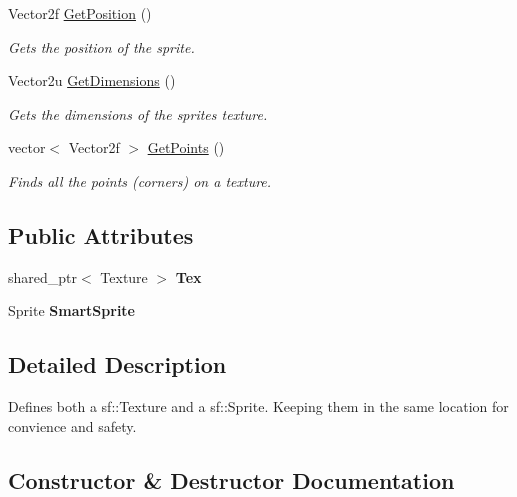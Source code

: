 \begin{DoxyCompactItemize}
Vector2f \hyperlink{struct_smart_texture_aec1d814d4f3dbbc6d5bf39e569b5fa30}{Get\+Position} ()
\begin{DoxyCompactList}\small\item\em Gets the position of the sprite. \end{DoxyCompactList}\item 
Vector2u \hyperlink{struct_smart_texture_a18d5089ac0e730deb87bda09377f5402}{Get\+Dimensions} ()
\begin{DoxyCompactList}\small\item\em Gets the dimensions of the sprites texture. \end{DoxyCompactList}\item 
vector$<$ Vector2f $>$ \hyperlink{struct_smart_texture_a38430739f5dce9ba11b9d91395ba4e30}{Get\+Points} ()
\begin{DoxyCompactList}\small\item\em Finds all the points (corners) on a texture. \end{DoxyCompactList}\end{DoxyCompactItemize}
\subsection*{Public Attributes}
\begin{DoxyCompactItemize}
\item 
\mbox{\label{struct_smart_texture_abd3e8f969fccfab6c0bec0a3968c0f1a}} 
shared\+\_\+ptr$<$ Texture $>$ {\bfseries Tex}
\item 
\mbox{\label{struct_smart_texture_ac5a0faec8f404b30eea9edd1ee4690f6}} 
Sprite {\bfseries Smart\+Sprite}
\end{DoxyCompactItemize}


\subsection{Detailed Description}
Defines both a sf\+::\+Texture and a sf\+::\+Sprite. Keeping them in the same location for convience and safety. 



\subsection{Constructor \& Destructor Documentation}
\mbox{\label{struct_smart_texture_a1709abdbcbba9136de0acce7a243a88e}} 
